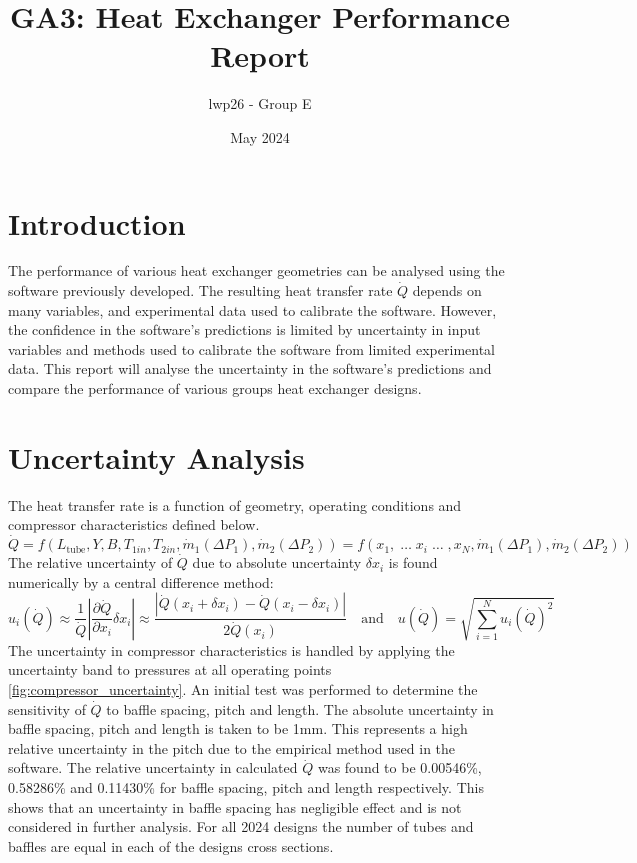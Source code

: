 \documentclass{article}
\begin{document}
\title{GA3: Heat Exchanger Performance Report}
\author{lwp26 - Group E}
\date{May 2024}
\maketitle 

\section{Introduction}

The performance of various heat exchanger geometries can be analysed using the software previously developed.
The resulting heat transfer rate $\dot{Q}$ depends on many variables, and experimental data used to calibrate the software.
However, the confidence in the software's predictions is limited by uncertainty in input variables and methods used to calibrate the software from limited experimental data.
This report will analyse the uncertainty in the software's predictions and compare the performance of various groups heat exchanger designs.

\section{Uncertainty Analysis}
The heat transfer rate is a function of geometry, operating conditions and compressor characteristics defined below.
\begin{equation}
    \dot{Q} = f(L_\text{tube}, Y, B, T_{1in}, T_{2in}, \dot{m}_1(\Delta P_1), \dot{m}_2(\Delta P_2)) = f(x_1, \; \dots \; x_i \; \dots \; , x_N, \dot{m}_1(\Delta P_1), \dot{m}_2(\Delta P_2))
\end{equation}
The relative uncertainty of $\dot{Q}$ due to absolute uncertainty $\delta x_i$ is found numerically by a central difference method:
\begin{equation}
    u_i(\dot{Q}) \approx \frac{1}{\dot{Q}}\left|\frac{\partial \dot{Q}}{\partial x_i} \delta x_i \right| \approx \frac{ \left| \dot{Q}(x_i + \delta x_i) - \dot{Q}(x_i - \delta x_i) \right|}{2\dot{Q}(x_i)} \label{eq:central_difference} \quad \text{and} \quad u(\dot{Q}) = \sqrt{\sum_{i=1}^N u_i(\dot{Q})^2}
\end{equation}
The uncertainty in compressor characteristics is handled by applying the uncertainty band to pressures at all operating points \ref{fig:compressor_uncertainty}.
An initial test was performed to determine the sensitivity of $\dot{Q}$ to baffle spacing, pitch and length.
The absolute uncertainty in baffle spacing, pitch and length is taken to be 1mm.
This represents a high relative uncertainty in the pitch due to the empirical method used in the software.
The relative uncertainty in calculated $\dot{Q}$ was found to be 0.00546\%, 0.58286\% and 0.11430\% for baffle spacing, pitch and length respectively.
This shows that an uncertainty in baffle spacing has negligible effect and is not considered in further analysis.
For all 2024 designs the number of tubes and baffles are equal in each of the designs cross sections.
\end{document}
